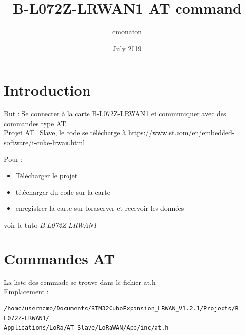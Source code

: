 \documentclass{article}
\title{B-L072Z-LRWAN1 AT command}
\author{cmonaton }
\date{July 2019}
\begin{document}
\maketitle

\section{Introduction}
But : Se connecter à la carte B-L072Z-LRWAN1 et communiquer avec des commandes type AT. \\

Projet AT\_Slave, le code se télécharge à  \url{https://www.st.com/en/embedded-software/i-cube-lrwan.html}

Pour : \begin{itemize}
    \item Télécharger le projet 
    \item télécharger du code sur la carte
    \item enregistrer la carte sur loraserver et recevoir les données
\end{itemize}
voir le tuto \textit{B-L072Z-LRWAN1}


\section{Commandes AT}

La liste des commade se trouve dans le fichier at.h \\

Emplacement :
\begin{verbatim}
/home/username/Documents/STM32CubeExpansion_LRWAN_V1.2.1/Projects/B-L072Z-LRWAN1/
Applications/LoRa/AT_Slave/LoRaWAN/App/inc/at.h
\end{verbatim}
\end{document}
